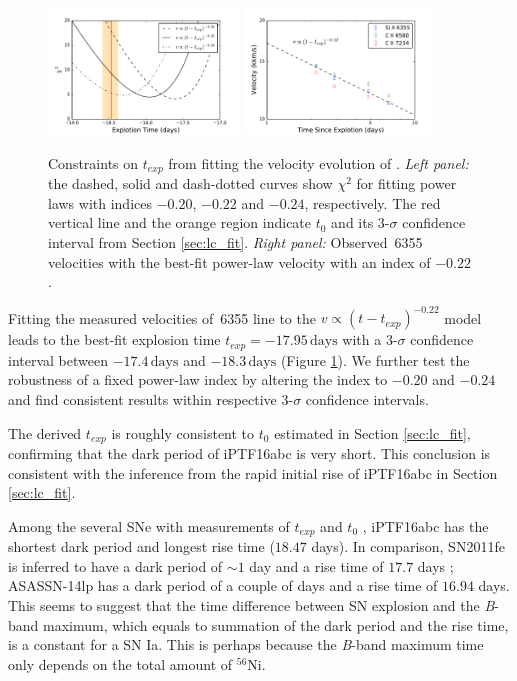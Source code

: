 \documentclass[twocolumn]{aastex61}
\begin{document}
\begin{figure}[!thb]
  \centering
  \includegraphics[width=0.45\textwidth]{exp_date_chi2.pdf}
  \includegraphics[width=0.45\textwidth]{SiIIVelocity.pdf}
  \caption{Constraints on $t_{exp}$ from fitting the velocity
    evolution of . \textit{Left panel:} the dashed, solid
    and dash-dotted curves show $\chi^2$ for fitting power laws with
    indices $-0.20$, $-0.22$ and $-0.24$, respectively. The red
    vertical line and the orange region indicate $t_0$ and its
    3-$\sigma$ confidence interval from Section
    \ref{sec:lc_fit}. \textit{Right panel:} Observed \,6355
    velocities with the best-fit power-law velocity with an index of
    $-0.22$.}
  \label{fig:velocity_t_exp}
\end{figure}

Fitting the measured velocities of \,6355 line to the
$v\propto(t-t_{exp})^{-0.22}$ model leads to the best-fit explosion
time $t_{exp}=-17.95\,\textrm{days}$ with a 3-$\sigma$ confidence
interval between $-17.4\,\textrm{days}$ and $-18.3\,\textrm{days}$
(Figure \ref{fig:velocity_t_exp}). We further test the robustness of
a fixed power-law index by altering the index to $-0.20$ and $-0.24$
and find consistent results within respective 3-$\sigma$ confidence
intervals.

The derived $t_{exp}$ is roughly consistent to $t_0$ estimated in
Section \ref{sec:lc_fit}, confirming that the dark period of iPTF16abc
is very short. This conclusion is consistent with the inference from the
rapid initial rise of iPTF16abc in Section \ref{sec:lc_fit}. 

Among the several SNe with measurements of $t_{exp}$ and $t_0$
\citep{2014ApJ...784...85P,2016ApJ...826..144S}, iPTF16abc has the
shortest dark period and longest rise time ($18.47$ days). In
comparison, SN2011fe is inferred to have a dark period of $\sim 1$
day \citep{2014ApJ...784...85P} and a rise time of $17.7$ days
\citep{2013A&A...554A..27P}; ASASSN-14lp has a dark period of a couple
of days and a rise time of $16.94$ days. This seems to suggest that
the time difference between SN explosion and the \textit{B}-band maximum,
which equals to summation of the dark period and the rise time, is a
constant for a SN Ia. This is perhaps because the \textit{B}-band maximum
time only depends on the total amount of $^{56}$Ni. 
\end{document}
